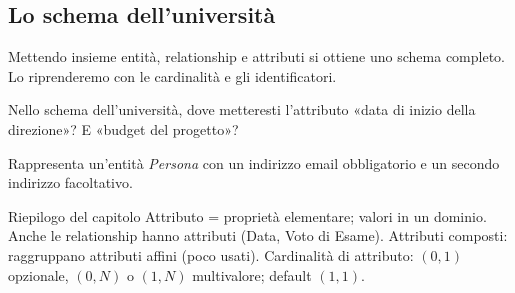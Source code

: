 \subsection{Lo schema dell'università}

Mettendo insieme entità, relationship e attributi si ottiene uno schema completo. Lo riprenderemo con le cardinalità e gli identificatori.

\par\noindent\begin{minipage}{\linewidth}
\begin{center}\end{center}
\end{minipage}\par

\begin{esercizi}
\begin{passi}
  \item Nello schema dell'università, dove metteresti l'attributo «data di inizio della direzione»? E «budget del progetto»?
  \item Rappresenta un'entità \emph{Persona} con un indirizzo email obbligatorio e un secondo indirizzo facoltativo.
\end{passi}
\end{esercizi}

\begin{appunti}{Riepilogo del capitolo}
 Attributo = proprietà elementare; valori in un dominio.
 Anche le relationship hanno attributi (Data, Voto di Esame).
 Attributi composti: raggruppano attributi affini (poco usati).
 Cardinalità di attributo: $(0,1)$ opzionale, $(0,N)$ o $(1,N)$ multivalore; default $(1,1)$.
\end{appunti}
